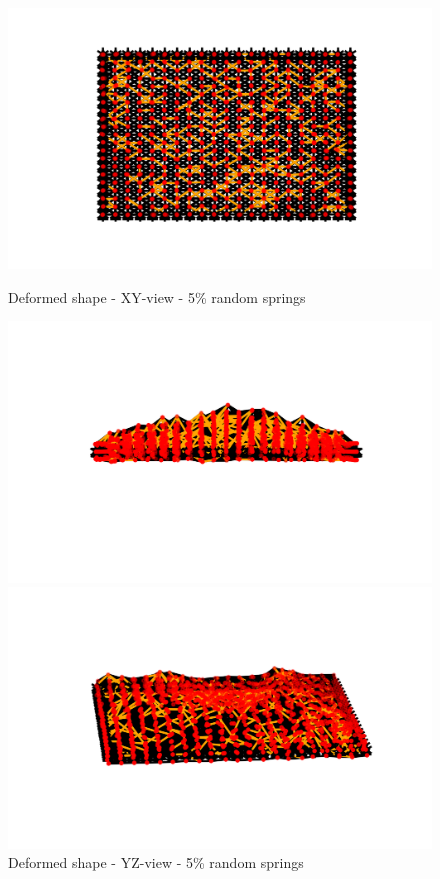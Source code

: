 \begin{figure}[!htbp]
\begin{minipage}{0.3\textwidth}
    \centering
    \includegraphics[width = 1\textwidth]{Figures/rand_5_XY.png}
    \caption{Deformed shape - XY-view - 5\% random springs}
    \label{fig:rand_5_xy}
\end{minipage}
\hspace{5mm}
\begin{minipage}{0.3\textwidth}
    \centering
    \includegraphics[width = 1\textwidth]{Figures/rand_5_YZ.png}
    \caption{Deformed shape - YZ-view - 5\% random springs}
    \label{fig:rand_5_yz}
\end{minipage}
\hspace{5mm}
\begin{minipage}{0.3\textwidth}
    \centering
    \includegraphics[width = 1\textwidth]{Figures/rand_5_3D.png}

\end{minipage}
\end{figure}
